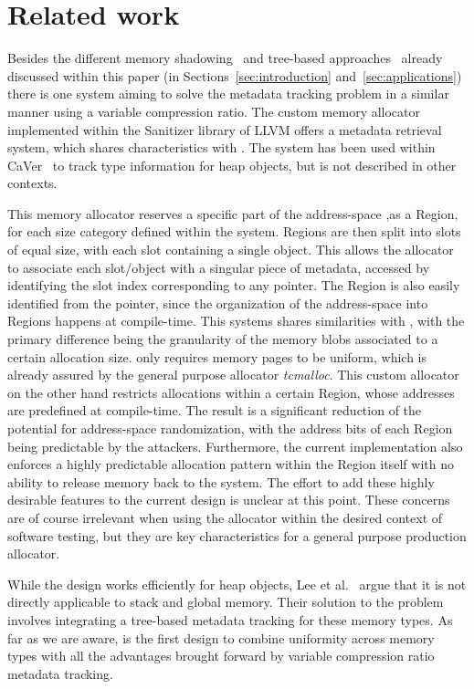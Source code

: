 \section{Related work}
\label{sec:related}

Besides the different memory shadowing~\cite{akritidis2008preventing,akritidis2009baggy,younan2015freesentry}
and tree-based approaches~\cite{haller2013mempick,lee2015preventing} already discussed within this paper (in Sections~\ref{sec:introduction}
 and~\ref{sec:applications}) there is one system aiming
to solve the metadata tracking problem in a similar manner using a variable compression ratio. The
custom memory allocator implemented within the Sanitizer library of LLVM offers a metadata retrieval system,
which shares characteristics with \projectname{}. The system has been used within CaVer~\cite{lee2015type}
to track type information for heap objects, but is not described in other contexts.

This memory allocator reserves a specific part of the address-space
,as a Region, for each size category defined within the system. Regions are then split into slots of equal
size, with each slot containing a single object. This allows the allocator to associate each slot/object
with a singular piece of metadata, accessed by identifying the slot index corresponding to any pointer.
The Region is also easily identified from the pointer, since the organization of the address-space into
Regions happens at compile-time. This systems shares similarities with \projectname{}, with the primary difference being
the granularity of the memory blobs associated to a certain allocation size. \projectname{} only requires
memory pages to be uniform, which is already assured by the general purpose allocator \emph{tcmalloc}. This custom allocator
on the other hand restricts allocations within a certain Region, whose addresses are predefined at compile-time.
The result is a significant reduction of the potential for address-space randomization, with the address bits
of each Region being predictable by the attackers. Furthermore, the current implementation
also enforces a highly predictable allocation pattern within the Region itself with no ability to release
memory back to the system. The effort to add these highly desirable features to the current design is
unclear at this point. These concerns are of course irrelevant when using the allocator within the desired
context of software testing, but they are key characteristics for a general purpose production allocator.

While the design works efficiently for heap objects, Lee et al.~\cite{lee2015type} argue
that it is not directly applicable to stack and global memory. Their solution to the problem involves
integrating a tree-based metadata tracking for these memory types.
As far as we are aware, \projectname{} is the first design to combine uniformity across memory types with all the advantages
brought forward by variable compression ratio metadata tracking.
